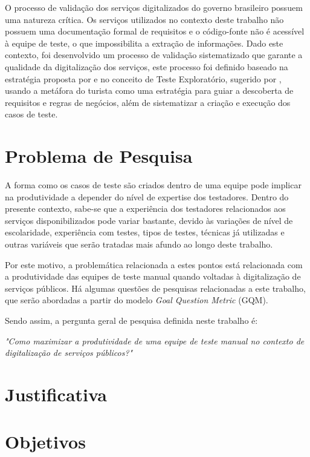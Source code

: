 O processo de validação dos serviços digitalizados do governo brasileiro possuem uma natureza crítica. Os serviços utilizados no
contexto deste trabalho não possuem uma documentação formal de requisitos e o código-fonte não é acessível à equipe de teste, o que
impossibilita a extração de informações. Dado este contexto, foi desenvolvido um processo de validação sistematizado que garante
a qualidade da digitalização dos serviços, este processo foi definido baseado na estratégia proposta por \cite{elcock2006testing} e
no conceito de Teste Exploratório, sugerido por \cite{whittaker2009exploratory}, usando a metáfora do turista como uma estratégia
para guiar a descoberta de requisitos e regras de negócios, além de sistematizar a criação e execução dos casos de teste.

\section{Problema de Pesquisa}

A forma como os casos de teste são criados dentro de uma equipe pode implicar na produtividade a depender do nível de expertise dos
testadores. Dentro do presente contexto, sabe-se que a experiência dos testadores relacionados aos serviços disponibilizados
pode variar bastante, devido às variações de nível de escolaridade, experiência com testes, tipos de testes, técnicas já utilizadas
e outras variáveis que serão tratadas mais afundo ao longo deste trabalho.

Por este motivo, a problemática relacionada a estes pontos está relacionada com a produtividade das equipes de teste manual quando
voltadas à digitalização de serviços públicos. Há algumas questões de pesquisas relacionadas a este trabalho, que serão abordadas a partir do modelo
\textit{Goal Question Metric} (GQM).

Sendo assim, a pergunta geral de pesquisa definida neste trabalho é:

\textit{"Como maximizar a produtividade de uma equipe de teste manual no contexto de digitalização de serviços públicos?"}

\section{Justificativa}




\section{Objetivos}
